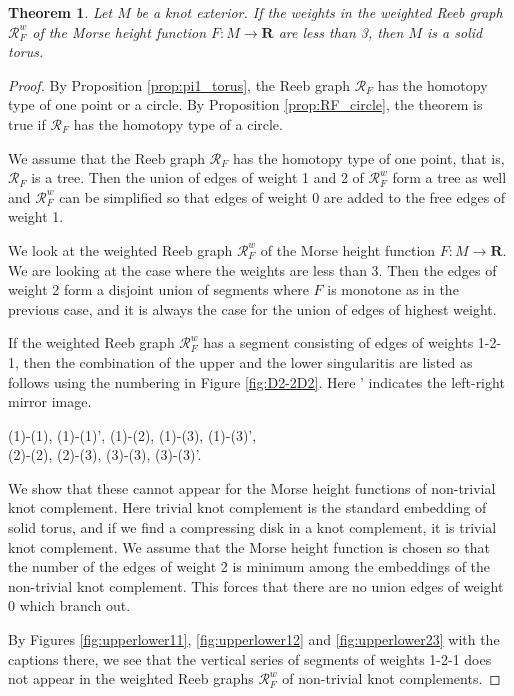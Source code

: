 \documentclass{amsart}
\newtheorem{theorem}{Theorem}[section]
\numberwithin{equation}{section}
\newcommand{\RR}{{\boldsymbol{R}}}
\newcommand{\lra}{\longrightarrow}
\begin{document}
\begin{theorem}\label{th:w<3knotExt}
Let $M$ be a knot exterior. If the weights in the weighted Reeb graph
$\mathcal{R}_{F}^w$ of the Morse height function $F:M\lra \RR$ are less than 3, then $M$ is a solid torus.
\end{theorem}


\begin{proof} 
By Proposition \ref{prop:pi1_torus}, the Reeb graph $\mathcal{R}_F$ has the homotopy type of one point or a circle. By Proposition \ref{prop:RF_circle}, the theorem is true if $\mathcal{R}_F$ has the homotopy type of a circle.


We assume that the Reeb graph $\mathcal{R}_F$ has the homotopy type of one point, that is,  $\mathcal{R}_F$ is a tree.
Then the union of edges of weight 1 and 2 of $\mathcal{R}^w_F$ form a tree as well and $\mathcal{R}^w_F$ can be simplified so that edges of weight 0
are added to the free edges of weight 1.

We look at the weighted Reeb graph $\mathcal{R}^w_F$ of the Morse height function $F:M\lra \RR$. We are looking at the case where the weights are less than 3.
Then the edges of weight 2  form a disjoint union of segments where $F$ is monotone as in the previous case, and it is always the case for the union of edges of highest weight. 


If the weighted Reeb graph $\mathcal{R}_{F}^w$ has a segment consisting of edges of weights 1-2-1, then the combination of the upper and the lower singularitis are listed as follows using the numbering in Figure \ref{fig:D2-2D2}. Here {}' indicates the left-right mirror image.
\begin{center}
(1)-(1), (1)-(1)', (1)-(2), (1)-(3), (1)-(3)', \\(2)-(2), (2)-(3), (3)-(3), (3)-(3)'. 
\end{center}
We show that these cannot appear for the Morse height functions of non-trivial knot complement. 
Here trivial knot complement is the standard embedding of solid torus, and if we find a compressing disk in a knot complement, it is trivial knot complement. 
We assume that the Morse height function is chosen so that 
the number of the edges of weight 2 is minimum among the embeddings of the non-trivial knot complement. This forces that there are no union edges of weight 0 which branch out.

By Figures \ref{fig:upperlower11}, \ref{fig:upperlower12} and \ref{fig:upperlower23} with the captions there, we see that the vertical series of segments of weights 1-2-1 does not appear in the weighted Reeb graphs $\mathcal{R}_{F}^w$ of non-trivial knot complements.


\end{proof}
\end{document}

